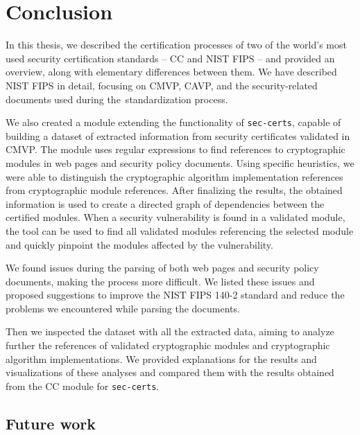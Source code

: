 \chapter*{Conclusion}

In this thesis, we described the certification processes of two of the world's most used security certification standards -- CC and NIST FIPS -- and provided an overview, along with elementary differences between them. We have described NIST FIPS in detail, focusing on CMVP, CAVP, and the security-related documents used during the~standardization process. 

We also created a module extending the functionality of \texttt{sec-certs}, capable of building a dataset of extracted information from security certificates validated in CMVP. 
The module uses regular expressions to find references to cryptographic modules in web pages and security policy documents. Using specific heuristics, we were able to distinguish the cryptographic algorithm implementation references from cryptographic module references. After finalizing the results, the obtained information is used to create a directed graph of dependencies between the certified modules. When a security vulnerability is found in a validated module, the tool can be used to find all validated modules referencing the selected module and quickly pinpoint the modules affected by the vulnerability.

We found issues during the parsing of both web pages and security policy documents, making the process more difficult. We listed these issues and proposed suggestions to improve the NIST FIPS 140-2 standard and reduce the problems we encountered while parsing the documents.

Then we inspected the dataset with all the extracted data, aiming to analyze further the references of validated cryptographic modules and cryptographic algorithm implementations. We provided explanations for the results and visualizations of these analyses and compared them with the results obtained from the CC module for \texttt{sec-certs}.

\section*{Future work}

